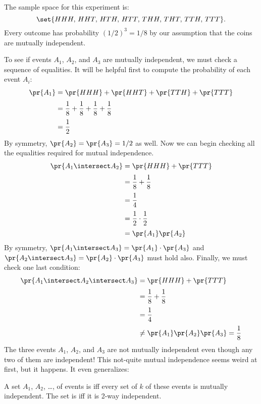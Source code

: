 The sample space for this experiment is:
%
\[
    \set{HHH,\, HHT,\, HTH,\, HTT,\, THH,\, THT,\, TTH,\, TTT}.
\]
%
Every outcome has probability $(1/2)^3 = 1/8$ by our assumption that
the coins are mutually independent.

To see if events $A_1$, $A_2$, and $A_3$ are mutually independent, we
must check a sequence of equalities.  It will be helpful first to
compute the probability of each event $A_i$:
%
\begin{align*}
\pr{A_1} & = \pr{HHH} + \pr{HHT} + \pr{TTH} + \pr{TTT} \\[2pt]
         & = \frac{1}{8} + \frac{1}{8} + \frac{1}{8} + \frac{1}{8}\\[2pt]
         & = \frac{1}{2}
\end{align*}
%
By symmetry, $\pr{A_2} = \pr{A_3} = 1/2$ as well.  Now we can begin
checking all the equalities required for mutual independence.
%
\begin{align*}
\pr{A_1 \intersect A_2}
	& = \pr{HHH} + \pr{TTT} \\[2pt]
        & = \frac{1}{8} + \frac{1}{8} \\[2pt]
        & = \frac{1}{4} \\[2pt]
        & = \frac{1}{2} \cdot \frac{1}{2}\\[2pt]
        & = \pr{A_1} \pr{A_2}
\end{align*}
%
By symmetry, $\pr{A_1 \intersect A_3} = \pr{A_1} \cdot \pr{A_3}$ and
$\pr{A_2 \intersect A_3} = \pr{A_2} \cdot \pr{A_3}$ must hold also.
Finally, we must check one last condition:
%
\begin{align*}
\pr{A_1 \intersect A_2 \intersect A_3}      & = \pr{HHH} + \pr{TTT} \\[2pt]
                                & = \frac{1}{8} + \frac{1}{8} \\[2pt]
                                & = \frac{1}{4} \\[2pt]
                                & \neq \pr{A_1} \pr{A_2} \pr{A_3} = \frac{1}{8}
\end{align*}
%
The three events $A_1$, $A_2$, and $A_3$ are not mutually independent
even though any two of them are independent!  This not-quite
mutual independence seems weird at first, but it happens.   It even generalizes:

\begin{definition}\label{kway_independent_events}
  A set $A_1$, $A_2$, \dots, of events is 
  iff every set of $k$ of these events is mutually independent.  The
  set is  iff it is 2-way independent.
\end{definition}


